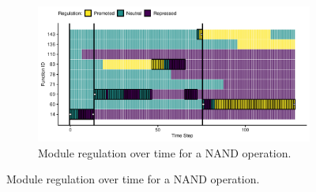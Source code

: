 
\begin{figure}
\centering

\begin{subfigure}[b]{0.95\textwidth}
    \centering
    \includegraphics[width=\textwidth]{chapters/05-tag-based-genetic-regulation/media/boolean-calc-prefix-networks/case-study-trace-id-24400-test_id-420-regulator-state-horizontal.pdf}
    \caption{\small  Module regulation over time for a NAND operation.}
    \label{chapter:tag-based-regulation:subfig:bc-nand-exec-trace}
\end{subfigure}%


\end{figure}
